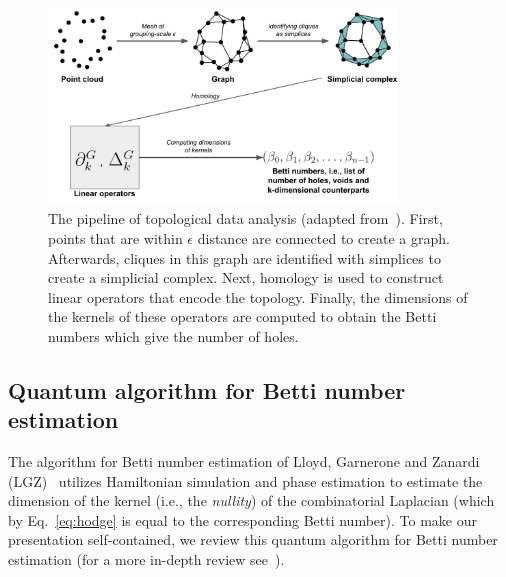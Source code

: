 \documentclass[a4paper, onecolumn, accepted=2022-08-28]{quantumarticle}
\begin{document}
\begin{figure}
\includegraphics[width=0.825\textwidth]{pipeline}%
\centering
\captionsetup{justification=raggedright}
\caption{\label{fig:tda} The pipeline of topological data analysis (adapted from~\cite{govek:figure}).
First, points that are within $\epsilon$ distance are connected to create a graph.
Afterwards, cliques in this graph are identified with simplices to create a simplicial complex.
Next, homology is used to construct linear operators that encode the topology.
Finally, the dimensions of the kernels of these operators are computed to obtain the Betti numbers which give the number of holes.}
\end{figure}

\subsection{Quantum algorithm for Betti number estimation
\label{subsec:qalg_betti}}
\renewcommand{\thefootnote}{\fnsymbol{footnote}}

The algorithm for Betti number estimation of Lloyd, Garnerone and Zanardi (LGZ)~\cite{lloyd:lgz_algorithm} utilizes Hamiltonian simulation and phase estimation to estimate the dimension of the kernel (i.e., the \emph{nullity}) of the combinatorial Laplacian (which by Eq.~\eqref{eq:hodge} is equal to the corresponding Betti number).
To make our presentation self-contained, we review this quantum algorithm for Betti number estimation (for a more in-depth review see~\cite{gunn:review}).
\end{document}
